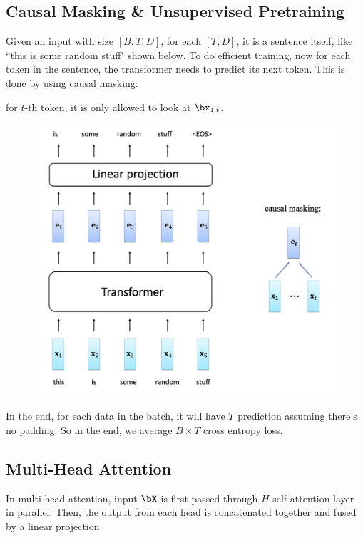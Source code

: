 \documentclass{article}
\begin{document}
\subsection{Causal Masking \& Unsupervised Pretraining}

Given an input with size $[B, T, D]$, for each $[T, D]$, it is a sentence itself, like ``this is some random stuff" shown below.
To do efficient training, now for each token in the sentence, the transformer needs to predict its next token.
This is done by using causal masking:

\begin{center}
	for $t$-th token, it is only allowed to look at $\bx_{1:t}$.
\end{center}


\begin{figure}[!h]
\centering
\includegraphics[scale=0.35]{imgs/causal-masking.png}
\end{figure}

In the end, for each data in the batch, it will have $T$ prediction assuming there's no padding. 
So in the end, we average $B \times T$ cross entropy loss.

\clearpage

\subsection{Multi-Head Attention}
In multi-head attention, input $\bX$ is first passed through $H$ self-attention layer in parallel.
Then, the output from each head is concatenated together and fused by a linear projection
\end{document}

